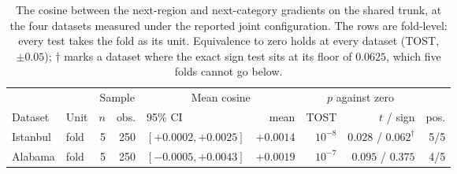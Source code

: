 %
\begin{table}[htbp]
    \centering
    \caption{The cosine between the next-region and next-category gradients on the shared trunk, at the four datasets measured under the reported joint configuration. The rows are fold-level: every test takes the fold as its unit. Equivalence to zero holds at every dataset (TOST, $\pm 0.05$); $\dagger$ marks a dataset where the exact sign test sits at its floor of $0.0625$, which five folds cannot go below.}
    \label{tab:apx:cosine}
    {\small
    \setlength{\tabcolsep}{4pt}
    \begin{tabular}{llrrlrrrr}
        \toprule
        & & \multicolumn{2}{c}{Sample} & \multicolumn{2}{c}{Mean cosine} & \multicolumn{2}{c}{$p$ against zero} & \\
        \cmidrule(lr){3-4}\cmidrule(lr){5-6}\cmidrule(lr){7-8}
        Dataset & Unit & $n$ & obs. & 95\% CI & mean & TOST & $t$ / sign & pos. \\
        \midrule
        Istanbul   & fold & 5 & 250 & $[+0.0002, +0.0025]$ & $+0.0014$ & $10^{-8}$ & $0.028$ / $0.062^{\dagger}$ & 5/5 \\
        Alabama    & fold & 5 & 250 & $[-0.0005, +0.0043]$ & $+0.0019$ & $10^{-7}$ & $0.095$ / $0.375$ & 4/5 \\

\end{tabular}}
\end{table}
